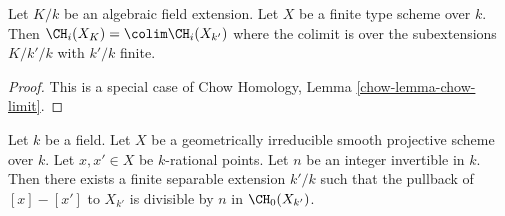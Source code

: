 \begin{lemma}
\label{lemma-chow-limit}
Let $K/k$ be an algebraic field extension. Let $X$ be a finite type
scheme over $k$. Then $\CH_i(X_K) = \colim \CH_i(X_{k'})$ where the
colimit is over the subextensions $K/k'/k$ with $k'/k$ finite.
\end{lemma}

\begin{proof}
This is a special case of
Chow Homology, Lemma \ref{chow-lemma-chow-limit}.
\end{proof}

\begin{lemma}
\label{lemma-divide-difference-points}
Let $k$ be a field. Let $X$ be a geometrically irreducible
smooth projective scheme over $k$. Let $x, x' \in X$ be $k$-rational points.
Let $n$ be an integer invertible in $k$.
Then there exists a finite separable extension $k'/k$ such that
the pullback of $[x] - [x']$ to $X_{k'}$
is divisible by $n$ in $\CH_0(X_{k'})$.
\end{lemma}

